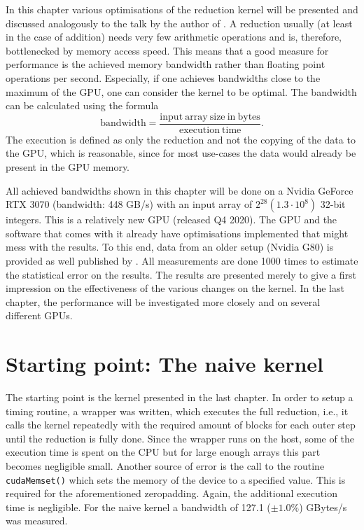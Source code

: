 In this chapter various optimisations of the reduction kernel will be presented and discussed analogously to the talk by the author of \cite{Harris}.
A reduction usually (at least in the case of addition) needs very few arithmetic operations and is, therefore, bottlenecked by memory access speed.
This means that a good measure for performance is the achieved memory bandwidth rather than floating point operations per second.
Especially, if one achieves bandwidths close to the maximum of the GPU, one can consider the kernel to be optimal.
The bandwidth can be calculated using the formula
\begin{equation}
    \mathrm{bandwidth} = \frac{\mathrm{input\ array\ size\ in\ bytes}}{\mathrm{execution\ time}}.
\end{equation}
The execution is defined as only the reduction and not the copying of the data to the GPU, which is reasonable, since for most use-cases the data would already be present in the GPU memory.

All achieved bandwidths shown in this chapter will be done on a Nvidia GeForce RTX 3070 (bandwidth: 448 GB/s) with an input array of \( 2^{28} (1.3\cdot 10^8)\) 32-bit integers. 
This is a relatively new GPU (released Q4 2020).
The GPU and the software that comes with it already have optimisations implemented that might mess with the results.
To this end, data from an older setup (Nvidia G80) is provided as well published by \cite{Harris}.
All measurements are done 1000 times to estimate the statistical error on the results.
The results are presented merely to give a first impression on the effectiveness of the various changes on the kernel.
In the last chapter, the performance will be investigated more closely and on several different GPUs.

\section{Starting point: The naive kernel}
The starting point is the kernel presented in the last chapter.
In order to setup a timing routine, a wrapper was written, which executes the full reduction, i.e., it calls the kernel repeatedly with the required amount of blocks for each outer step until the reduction is fully done. 
Since the wrapper runs on the host, some of the execution time is spent on the CPU but for large enough arrays this part becomes negligible small.
Another source of error is the call to the routine \texttt{cudaMemset()} which sets the memory of the device to a specified value.
This is required for the aforementioned zeropadding.
Again, the additional execution time is negligible.
For the naive kernel a bandwidth of 127.1 (\(\pm 1.0\% \)) GBytes/s was measured.

